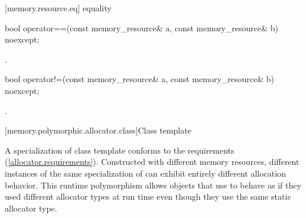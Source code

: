 [memory.resource.eq]{ equality}

%
\begin{itemdecl}
bool operator==(const memory_resource& a, const memory_resource& b) noexcept;
\end{itemdecl}

\begin{itemdescr}
\pnum
\returns
{}.
\end{itemdescr}

%
\begin{itemdecl}
bool operator!=(const memory_resource& a, const memory_resource& b) noexcept;
\end{itemdecl}

\begin{itemdescr}
\pnum
\returns
{}.
\end{itemdescr}

[memory.polymorphic.allocator.class]{Class template }

\pnum
A specialization of class template 
conforms to the  requirements (\ref{allocator.requirements}).
Constructed with different memory resources,
different instances of the same specialization of 
can exhibit entirely different allocation behavior.
This runtime polymorphism allows objects that use 
to behave as if they used different allocator types at run time
even though they use the same static allocator type.

